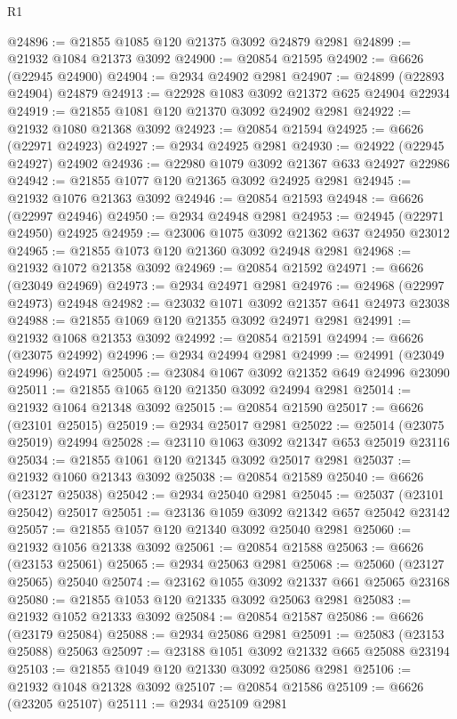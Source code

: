 \begin{lexlean}{R1}
\begin{coremodule}
@24896 := @21855 @1085 @120 @21375 @3092 @24879 @2981
@24899 := @21932 @1084 @21373 @3092
@24900 := @20854 @21595
@24902 := @6626 (@22945 @24900)
@24904 := @2934 @24902 @2981
@24907 := @24899 (@22893 @24904) @24879
@24913 := @22928 @1083 @3092 @21372 @625 @24904 @22934
@24919 := @21855 @1081 @120 @21370 @3092 @24902 @2981
@24922 := @21932 @1080 @21368 @3092
@24923 := @20854 @21594
@24925 := @6626 (@22971 @24923)
@24927 := @2934 @24925 @2981
@24930 := @24922 (@22945 @24927) @24902
@24936 := @22980 @1079 @3092 @21367 @633 @24927 @22986
@24942 := @21855 @1077 @120 @21365 @3092 @24925 @2981
@24945 := @21932 @1076 @21363 @3092
@24946 := @20854 @21593
@24948 := @6626 (@22997 @24946)
@24950 := @2934 @24948 @2981
@24953 := @24945 (@22971 @24950) @24925
@24959 := @23006 @1075 @3092 @21362 @637 @24950 @23012
@24965 := @21855 @1073 @120 @21360 @3092 @24948 @2981
@24968 := @21932 @1072 @21358 @3092
@24969 := @20854 @21592
@24971 := @6626 (@23049 @24969)
@24973 := @2934 @24971 @2981
@24976 := @24968 (@22997 @24973) @24948
@24982 := @23032 @1071 @3092 @21357 @641 @24973 @23038
@24988 := @21855 @1069 @120 @21355 @3092 @24971 @2981
@24991 := @21932 @1068 @21353 @3092
@24992 := @20854 @21591
@24994 := @6626 (@23075 @24992)
@24996 := @2934 @24994 @2981
@24999 := @24991 (@23049 @24996) @24971
@25005 := @23084 @1067 @3092 @21352 @649 @24996 @23090
@25011 := @21855 @1065 @120 @21350 @3092 @24994 @2981
@25014 := @21932 @1064 @21348 @3092
@25015 := @20854 @21590
@25017 := @6626 (@23101 @25015)
@25019 := @2934 @25017 @2981
@25022 := @25014 (@23075 @25019) @24994
@25028 := @23110 @1063 @3092 @21347 @653 @25019 @23116
@25034 := @21855 @1061 @120 @21345 @3092 @25017 @2981
@25037 := @21932 @1060 @21343 @3092
@25038 := @20854 @21589
@25040 := @6626 (@23127 @25038)
@25042 := @2934 @25040 @2981
@25045 := @25037 (@23101 @25042) @25017
@25051 := @23136 @1059 @3092 @21342 @657 @25042 @23142
@25057 := @21855 @1057 @120 @21340 @3092 @25040 @2981
@25060 := @21932 @1056 @21338 @3092
@25061 := @20854 @21588
@25063 := @6626 (@23153 @25061)
@25065 := @2934 @25063 @2981
@25068 := @25060 (@23127 @25065) @25040
@25074 := @23162 @1055 @3092 @21337 @661 @25065 @23168
@25080 := @21855 @1053 @120 @21335 @3092 @25063 @2981
@25083 := @21932 @1052 @21333 @3092
@25084 := @20854 @21587
@25086 := @6626 (@23179 @25084)
@25088 := @2934 @25086 @2981
@25091 := @25083 (@23153 @25088) @25063
@25097 := @23188 @1051 @3092 @21332 @665 @25088 @23194
@25103 := @21855 @1049 @120 @21330 @3092 @25086 @2981
@25106 := @21932 @1048 @21328 @3092
@25107 := @20854 @21586
@25109 := @6626 (@23205 @25107)
@25111 := @2934 @25109 @2981

\end{coremodule}
\end{lexlean}
